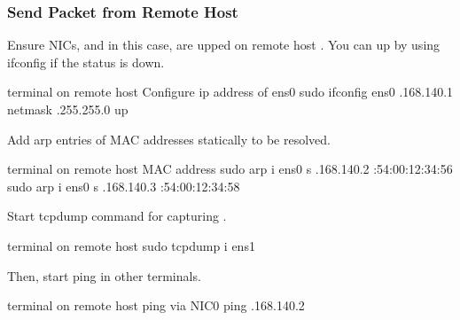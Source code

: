 \documentclass[a4paper,11pt,openany,oneside,english]{sphinxmanual}
\begin{document}
\subsubsection{Send Packet from Remote Host}
\label{\detokenize{usecases/spp_vf:send-packet-from-remote-host}}
Ensure NICs,  and  in this case, are upped on remote host
. You can up by using ifconfig if the status is down.

\begin{sphinxVerbatim}[commandchars=\\\{\},formatcom=\footnotesize]
 terminal  on remote host
 Configure ip address of ens0
 sudo ifconfig ens0 .168.140.1 netmask .255.255.0 up
\end{sphinxVerbatim}

Add arp entries of MAC addresses statically to be resolved.

\begin{sphinxVerbatim}[commandchars=\\\{\},formatcom=\footnotesize]
 terminal  on remote host
  MAC address
 sudo arp \PYGZhy{}i ens0 \PYGZhy{}s .168.140.2 :54:00:12:34:56
 sudo arp \PYGZhy{}i ens0 \PYGZhy{}s .168.140.3 :54:00:12:34:58
\end{sphinxVerbatim}

Start tcpdump command for capturing .

\begin{sphinxVerbatim}[commandchars=\\\{\},formatcom=\footnotesize]
 terminal  on remote host
 sudo tcpdump \PYGZhy{}i ens1
\end{sphinxVerbatim}

Then, start ping in other terminals.

\begin{sphinxVerbatim}[commandchars=\\\{\},formatcom=\footnotesize]
 terminal  on remote host
 ping via NIC0
 ping .168.140.2
\end{sphinxVerbatim}
\end{document}
